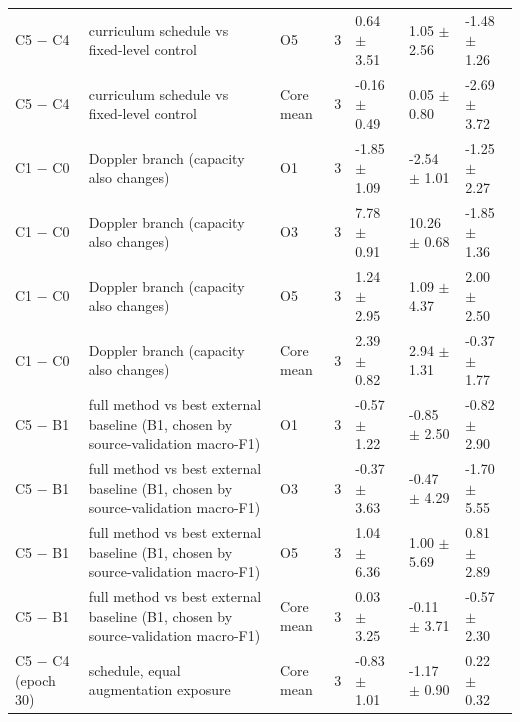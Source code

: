 \begin{table}[t]
\begin{tabular}{lllllll}
C5 $-$ C4 & curriculum schedule vs fixed-level control & O5 & 3 & 0.64 $\pm$ 3.51 & 1.05 $\pm$ 2.56 & -1.48 $\pm$ 1.26 \\
C5 $-$ C4 & curriculum schedule vs fixed-level control & Core mean & 3 & -0.16 $\pm$ 0.49 & 0.05 $\pm$ 0.80 & -2.69 $\pm$ 3.72 \\
C1 $-$ C0 & Doppler branch (capacity also changes) & O1 & 3 & -1.85 $\pm$ 1.09 & -2.54 $\pm$ 1.01 & -1.25 $\pm$ 2.27 \\
C1 $-$ C0 & Doppler branch (capacity also changes) & O3 & 3 & 7.78 $\pm$ 0.91 & 10.26 $\pm$ 0.68 & -1.85 $\pm$ 1.36 \\
C1 $-$ C0 & Doppler branch (capacity also changes) & O5 & 3 & 1.24 $\pm$ 2.95 & 1.09 $\pm$ 4.37 & 2.00 $\pm$ 2.50 \\
C1 $-$ C0 & Doppler branch (capacity also changes) & Core mean & 3 & 2.39 $\pm$ 0.82 & 2.94 $\pm$ 1.31 & -0.37 $\pm$ 1.77 \\
C5 $-$ B1 & full method vs best external baseline (B1, chosen by source-validation macro-F1) & O1 & 3 & -0.57 $\pm$ 1.22 & -0.85 $\pm$ 2.50 & -0.82 $\pm$ 2.90 \\
C5 $-$ B1 & full method vs best external baseline (B1, chosen by source-validation macro-F1) & O3 & 3 & -0.37 $\pm$ 3.63 & -0.47 $\pm$ 4.29 & -1.70 $\pm$ 5.55 \\
C5 $-$ B1 & full method vs best external baseline (B1, chosen by source-validation macro-F1) & O5 & 3 & 1.04 $\pm$ 6.36 & 1.00 $\pm$ 5.69 & 0.81 $\pm$ 2.89 \\
C5 $-$ B1 & full method vs best external baseline (B1, chosen by source-validation macro-F1) & Core mean & 3 & 0.03 $\pm$ 3.25 & -0.11 $\pm$ 3.71 & -0.57 $\pm$ 2.30 \\
C5 $-$ C4 (epoch 30) & schedule, equal augmentation exposure & Core mean & 3 & -0.83 $\pm$ 1.01 & -1.17 $\pm$ 0.90 & 0.22 $\pm$ 0.32 \\
\hline
\end{tabular}
\end{table}
